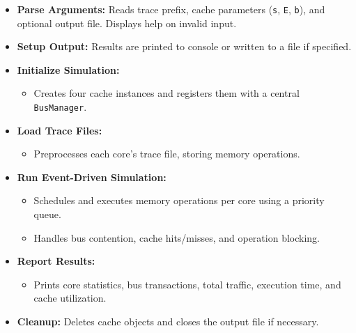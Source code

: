 \documentclass[a4paper,12pt]{article}
\begin{document}
\begin{itemize}
    \item \textbf{Parse Arguments:} Reads trace prefix, cache parameters (\texttt{s}, \texttt{E}, \texttt{b}), and optional output file. Displays help on invalid input.
    
    \item \textbf{Setup Output:} Results are printed to console or written to a file if specified.

    \item \textbf{Initialize Simulation:} 
    \begin{itemize}
        \item Creates four cache instances and registers them with a central \texttt{BusManager}.
    \end{itemize}

    \item \textbf{Load Trace Files:} 
    \begin{itemize}
        \item Preprocesses each core's trace file, storing memory operations.
    \end{itemize}

    \item \textbf{Run Event-Driven Simulation:}
    \begin{itemize}
        \item Schedules and executes memory operations per core using a priority queue.
        \item Handles bus contention, cache hits/misses, and operation blocking.
    \end{itemize}

    \item \textbf{Report Results:}
    \begin{itemize}
        \item Prints core statistics, bus transactions, total traffic, execution time, and cache utilization.
    \end{itemize}

    \item \textbf{Cleanup:} Deletes cache objects and closes the output file if necessary.
\end{itemize}
\end{document}
